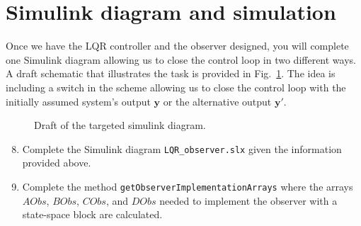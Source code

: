 \section{Simulink diagram and simulation}
	Once we have the LQR controller and the observer designed, you will complete one Simulink diagram allowing us to close the control loop in two different ways.
	A draft schematic that illustrates the task is provided in Fig.\ \ref{fig:simulinkDraft}.
	The idea is including a switch in the scheme allowing us to close the control loop with the initially assumed system's output %
	$\mathbf{y}$ %
	or the alternative output $\mathbf{y}'$.
	\begin{figure}[!h]
		\centering
		\caption{Draft of the targeted simulink diagram.}
		\label{fig:simulinkDraft}
	\end{figure}	

	\begin{enumerate}
		\setcounter{enumi}{7}
		\item Complete the Simulink diagram \texttt{LQR\_observer.slx} given the information provided above. 
		


		\item Complete the method \texttt{getObserverImplementationArrays} where the arrays %
		$AObs$, %
		$BObs$, %
		$CObs$, and %
		$DObs$  %
		needed to implement the observer with a state-space block are calculated.
	\end{enumerate}

